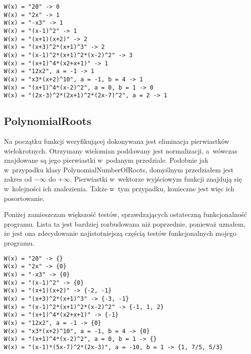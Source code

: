 \begin{lstlisting}
W(x) = "20" -> 0
W(x) = "2x" -> 1
W(x) = "-x3" -> 1
W(x) = "(x-1)^2" -> 1
W(x) = "(x+1)(x+2)" -> 2
W(x) = "(x+3)^2*(x+1)^3" -> 2
W(x) = "(x-1)^2*(x+1)^2*(x-2)^2" -> 3
W(x) = "(x+1)^4*(x2+x+1)" -> 1
W(x) = "12x2", a = -1 -> 1
W(x) = "x3*(x+2)^10", a = -1, b = 4 -> 1
W(x) = "(x+1)^4*(x-2)^2", a = 0, b = 1 -> 0
W(x) = "(2x-3)^2*(2x+1)^2*(2x-7)^2", a = 2 -> 1
\end{lstlisting}

\subsection{PolynomialRoots}

Na początku funkcji weryfikującej dokonywana jest eliminacja pierwiastków wielokrotnych. Otrzymany wielomian poddawany jest normalizacji, a~wówczas znajdowane są jego pierwiastki w~podanym przedziale. Podobnie jak w~przypadku klasy PolynomialNumberOfRoots, domyślnym przedziałem jest zakres od $-\infty$ do $+\infty$. Pierwiastki w~wektorze wyjściowym funkcji znajdują się w~kolejności ich znalezienia. Także w~tym przypadku, konieczne jest więc ich posortowanie.

Poniżej zamieszczam większość testów, sprawdzających ostateczną funkcjonalność programu. Lista ta jest bardziej rozbudowana niż poprzednie, ponieważ uznałem, że jest ona zdecydowanie najistotniejszą częścią testów funkcjonalnych mojego programu.

\begin{lstlisting}
W(x) = "20" -> {}
W(x) = "2x" -> {0}
W(x) = "-x3" -> {0}
W(x) = "(x-1)^2" -> {0}
W(x) = "(x+1)(x+2)" -> {-2, -1}
W(x) = "(x+3)^2*(x+1)^3" -> {-3, -1}
W(x) = "(x-1)^2*(x+1)^2*(x-2)^2" -> {-1, 1, 2}
W(x) = "(x+1)^4*(x2+x+1)" -> {-1}
W(x) = "12x2", a = -1 -> {0}
W(x) = "x3*(x+2)^10", a = -1, b = 4 -> {0}
W(x) = "(x+1)^4*(x-2)^2", a = 0, b = 1 -> {}
W(x) = "(x-1)*(5x-7)^2*(2x-3)", a = -10, b = 1 -> {1, 7/5, 5/3}
\end{lstlisting}
